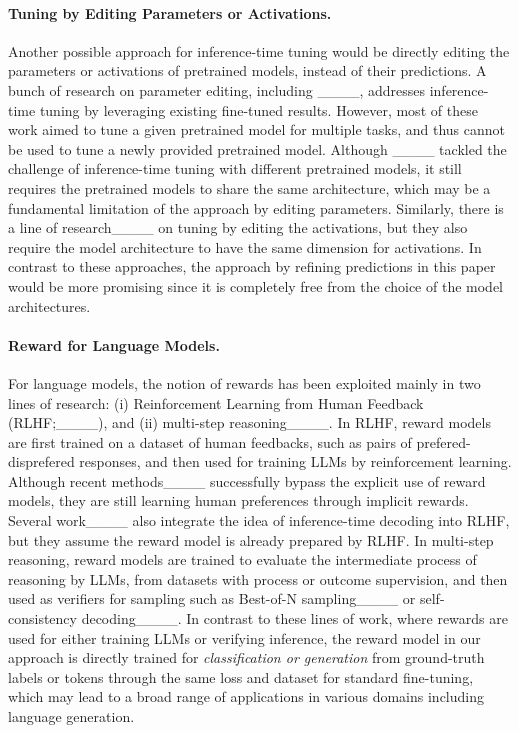 \paragraph{Tuning by Editing Parameters or Activations.}
Another possible approach for inference-time tuning would be directly editing the parameters or activations of pretrained models, instead of their predictions.
A bunch of research on parameter editing, including ____, addresses inference-time tuning by leveraging existing fine-tuned results.
However, most of these work aimed to tune a given pretrained model for multiple tasks, and thus cannot be used to tune a newly provided pretrained model.
Although ____ tackled the challenge of inference-time tuning with different pretrained models, it still requires the pretrained models to share the same architecture, which may be a fundamental limitation of the approach by editing parameters.
Similarly, there is a line of research____ on tuning by editing the activations, but they also require the model architecture to have the same dimension for activations.
In contrast to these approaches, the approach by refining predictions in this paper would be more promising since it is completely free from the choice of the model architectures.


\vspace{-0.3cm}
\paragraph{Reward for Language Models.}
For language models, the notion of rewards has been exploited mainly in two lines of research: (i) Reinforcement Learning from Human Feedback (RLHF;____), and (ii) multi-step reasoning____.
In RLHF, reward models are first trained on a dataset of human feedbacks, such as pairs of prefered-disprefered responses, and then used for training LLMs by reinforcement learning.
Although recent methods____ successfully bypass the explicit use of reward models, they are still learning human preferences through implicit rewards.
Several work____ also integrate the idea of inference-time decoding into RLHF, but they assume the reward model is already prepared by RLHF.
In multi-step reasoning, reward models are trained to evaluate the intermediate process of reasoning by LLMs, from datasets with process or outcome supervision, and then used as verifiers for sampling such as Best-of-N sampling____ or self-consistency decoding____.
In contrast to these lines of work, where rewards are used for either training LLMs or verifying inference, the reward model in our approach is directly trained for {\it classification or generation} from ground-truth labels or tokens through the same loss and dataset for standard fine-tuning, which may lead to a broad range of applications in various domains including language generation.